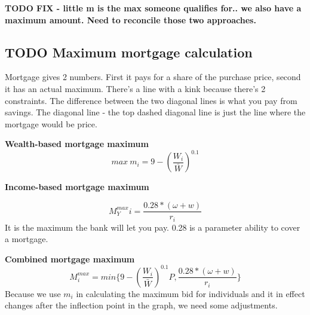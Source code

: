 \textbf{TODO FIX - little m is the max someone qualifies for.. we also have a maximum amount. Need to reconcile those two approaches.}
 
\subsection{TODO Maximum mortgage calculation}


Mortgage gives 2 numbers. First it pays for a share of the purchase price, second it has an actual maximum. There's a line with a kink because there's 2 constraints.  The difference between the two diagonal lines is what you pay from savings. 
The diagonal line - the top dashed diagonal line is just the line where the mortgage would be price.

\textbf{Wealth-based  mortgage maximum} 
 \[max\ m_i = 9-\left(\frac{W_i}{\bar W}\right)^{0.1} \]


\textbf{Income-based  mortgage maximum}

\[M^{max}_Yi = \frac{0.28*(\omega+w)}{r_i}\] It is the maximum the bank will let you pay.  0.28 is a parameter \gls{ability to cover a mortgage}.
 
\textbf{Combined  mortgage maximum}
\[ M_i^{max} = min \{9-\left(\frac{W_i}{\bar W}\right)^{0.1}P,  \frac{0.28*(\omega+w)}{r_i} \}\]
Because we use $m_i$ in calculating the maximum bid for individuals and it in effect changes after the inflection point in the graph, we need some adjustments. 

